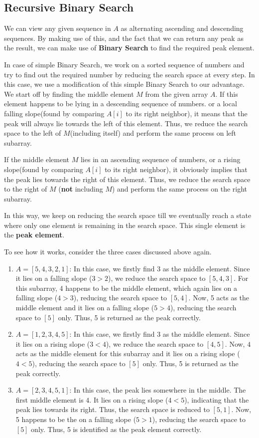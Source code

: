 \subsection{Recursive Binary Search}
We can view any given sequence in $A$ as alternating ascending and descending sequences. By making use of this, and the fact that we can return any peak as the result, we can make use of \textbf{Binary Search} to find the required peak element.
\par
In case of simple Binary Search, we work on a sorted sequence of numbers and try to find out the required number by reducing the search space at every step. In this case, we use a modification of this simple Binary Search to our advantage. We start off by finding the middle element $M$ from the given array $A$. If this element happens to be lying in a descending sequence of numbers. or a local falling slope(found by comparing $A[i]$ to its right neighbor), it means that the peak will always lie towards the left of this element. Thus, we reduce the search space to the left of $M$(including itself) and perform the same process on left subarray.
\par
If the middle element $M$ lies in an ascending sequence of numbers, or a rising slope(found by comparing $A[i]$ to its right neighbor), it obviously implies that the peak lies towards the right of this element. Thus, we reduce the search space to the right of $M$ (\textbf{not} including $M$) and perform the same process on the right subarray.
\par
In this way, we keep on reducing the search space till we eventually reach a state where only one element is remaining in the search space. This single element is the \textbf{peak element}.
\par
To see how it works, consider the three cases discussed above again.
\begin{enumerate}
\item $A=[5,4,3,2,1]$: In this case, we firstly find 3 as the middle element. Since it lies on a falling slope ($3>2$), we reduce the search space to $[5, 4, 3]$. For this subarray, 4 happens to be the middle element, which again lies on a falling slope ($4 > 3$), reducing the search space to $[5, 4]$. Now, 5 acts as the middle element and it lies on a falling slope ($5>4$), reducing the search space to $[5]$ only. Thus, 5 is returned as the peak correctly.
\item $A=[1,2,3,4,5]$:  In this case, we firstly find $3$ as the middle element. Since it lies on a rising slope ($3 < 4$), we reduce the search space to $[4, 5]$. Now, $4$ acts as the middle element for this subarray and it lies on a rising slope ($4< 5$), reducing the search space to $[5]$ only. Thus, 5 is returned as the peak correctly.
\item $A=[2,3,4,5,1]$: In this case, the peak lies somewhere in the middle. The first middle element is $4$. It lies on a rising slope ($4<5$), indicating that the peak lies towards its right. Thus, the search space is reduced to $[5, 1]$. Now, 5 happens to be the on a falling slope ($5 > 1$), reducing the search space to $[5]$ only. Thus, 5 is identified as the peak element correctly.
\end{enumerate}
